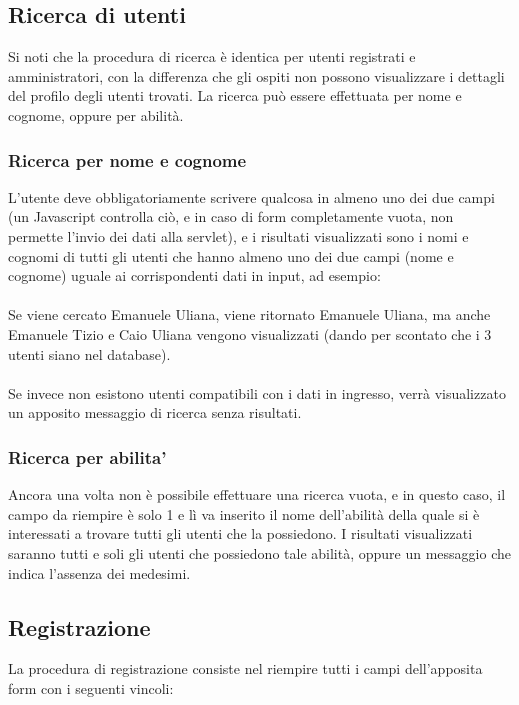 \documentclass[a4paper,12pt]{article}
\begin{document}
\subsection{Ricerca di utenti}
Si noti che la procedura di ricerca è identica per utenti registrati e amministratori, con la differenza che gli ospiti non possono visualizzare i dettagli del profilo degli utenti
trovati.
\linebreak
La ricerca può essere effettuata per nome e cognome, oppure per abilità.

\subsubsection{Ricerca per nome e cognome}
L'utente deve obbligatoriamente scrivere qualcosa in almeno uno dei due campi (un Javascript controlla ciò, e in caso di form completamente vuota, non permette l'invio dei dati alla
servlet), e i risultati visualizzati sono i nomi e cognomi di tutti gli utenti che hanno almeno uno dei due campi (nome e cognome) uguale ai corrispondenti dati in input, ad esempio:
\\
\vspace{0.1cm}
\\
Se viene cercato Emanuele Uliana, viene ritornato Emanuele Uliana, ma anche Emanuele Tizio e Caio Uliana vengono visualizzati (dando per scontato che i 3 utenti siano nel database).
\\
\vspace{0.1cm}
\\
Se invece non esistono utenti compatibili con i dati in ingresso, verrà visualizzato un apposito messaggio di ricerca senza risultati.

\subsubsection{Ricerca per abilita'}
Ancora una volta non è possibile effettuare una ricerca vuota, e in questo caso, il campo da riempire è solo 1 e lì va inserito il nome dell'abilità della quale si è interessati a
trovare tutti gli utenti che la possiedono. I risultati visualizzati saranno tutti e soli gli utenti che possiedono tale abilità, oppure un messaggio che indica l'assenza dei medesimi.

\subsection{Registrazione}
La procedura di registrazione consiste nel riempire tutti i campi dell'apposita form con i seguenti vincoli:
\end{document}
